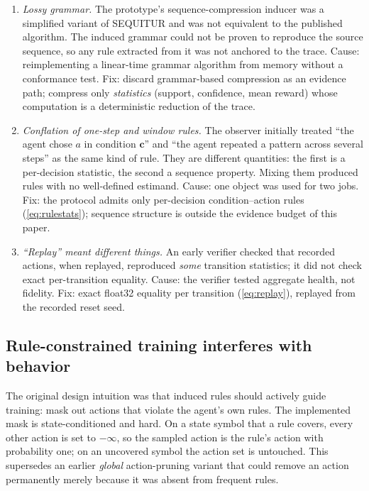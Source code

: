 \documentclass[11pt]{article}
\begin{document}
\begin{enumerate}
  \item \emph{Lossy grammar.} The prototype's sequence-compression inducer was a simplified variant
        of SEQUITUR \cite{nevillmanning1997identifying} and was not equivalent to the published
        algorithm. The induced grammar could not be proven to reproduce the source sequence, so any
        rule extracted from it was not anchored to the trace. Cause: reimplementing a linear-time
        grammar algorithm from memory without a conformance test. Fix: discard grammar-based
        compression as an evidence path; compress only \emph{statistics} (support, confidence, mean
        reward) whose computation is a deterministic reduction of the trace.
  \item \emph{Conflation of one-step and window rules.} The observer initially treated ``the agent
        chose $a$ in condition $\mathbf{c}$'' and ``the agent repeated a pattern across several
        steps'' as the same kind of rule. They are different quantities: the first is a per-decision
        statistic, the second a sequence property. Mixing them produced rules with no well-defined
        estimand. Cause: one object was used for two jobs. Fix: the protocol admits only per-decision
        condition--action rules (\ref{eq:rulestats}); sequence structure is outside the evidence
        budget of this paper.
  \item \emph{``Replay'' meant different things.} An early verifier checked that recorded actions,
        when replayed, reproduced \emph{some} transition statistics; it did not check exact
        per-transition equality. Cause: the verifier tested aggregate health, not fidelity. Fix:
        exact float32 equality per transition (\ref{eq:replay}), replayed from the recorded reset
        seed.
\end{enumerate}

\subsection{Rule-constrained training interferes with behavior}
\label{sec:evolution:constraint}

The original design intuition was that induced rules should actively guide training: mask out
actions that violate the agent's own rules. The implemented mask is state-conditioned and hard. On a
state symbol that a rule covers, every other action is set to $-\infty$, so the sampled action is the
rule's action with probability one; on an uncovered symbol the action set is untouched. This
supersedes an earlier \emph{global} action-pruning variant that could remove an action permanently
merely because it was absent from frequent rules.
\end{document}
